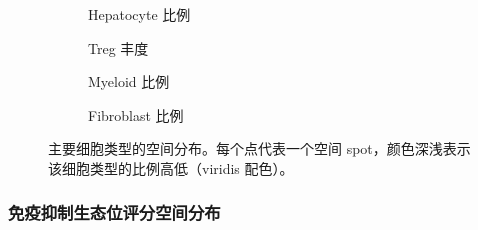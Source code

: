 \documentclass[12pt, a4paper]{ctexart}
\begin{document}
\begin{figure}[H]
\centering
\begin{subfigure}[b]{0.48\textwidth}
\caption{Hepatocyte 比例}
\end{subfigure}
\hfill
\begin{subfigure}[b]{0.48\textwidth}
\caption{Treg 丰度}
\end{subfigure}

\vspace{0.5cm}

\begin{subfigure}[b]{0.48\textwidth}
\caption{Myeloid 比例}
\end{subfigure}
\hfill
\begin{subfigure}[b]{0.48\textwidth}
\caption{Fibroblast 比例}
\end{subfigure}
\caption{主要细胞类型的空间分布。每个点代表一个空间 spot，颜色深浅表示该细胞类型的比例高低（viridis 配色）。}
\label{fig:spatial_celltypes}
\end{figure}

\subsubsection{免疫抑制生态位评分空间分布}
\end{document}
